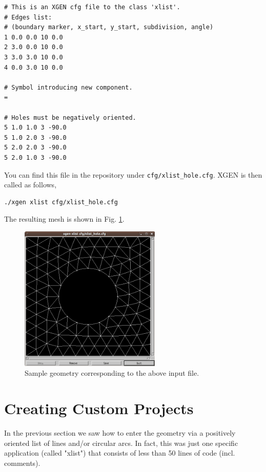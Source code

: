 \documentclass[12pt]{article}
\begin{document}
\begin{verbatim}
# This is an XGEN cfg file to the class 'xlist'.
# Edges list:
# (boundary marker, x_start, y_start, subdivision, angle)
1 0.0 0.0 10 0.0
2 3.0 0.0 10 0.0
3 3.0 3.0 10 0.0
4 0.0 3.0 10 0.0

# Symbol introducing new component.
=

# Holes must be negatively oriented.
5 1.0 1.0 3 -90.0
5 1.0 2.0 3 -90.0
5 2.0 2.0 3 -90.0
5 2.0 1.0 3 -90.0
\end{verbatim}

\noindent
You can find this file in the repository under {\tt cfg/xlist\_hole.cfg}. XGEN is 
then called as follows,

\begin{verbatim}
./xgen xlist cfg/xlist_hole.cfg
\end{verbatim}
The resulting mesh is shown in Fig. \ref{fig:7}.

  \begin{figure}[!ht]
  \begin{center}
  \includegraphics[width=0.6\textwidth]{xgen-7.png}
  \end{center}
  \vspace{-6mm}
  \caption{Sample geometry corresponding to the above input file.}
  \label{fig:7}
  \end{figure}


  \section{Creating Custom Projects} \label{new-project}

  In the previous section we saw how to enter the geometry 
  via a positively oriented list of lines and/or circular arcs.
  In fact, this was just one specific application (called "xlist")
  that consists of less than 50 lines of code (incl. comments). 
\end{document}
